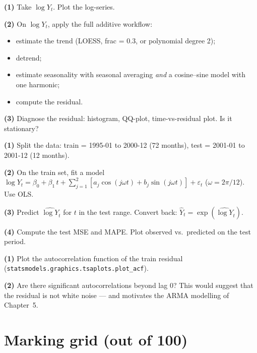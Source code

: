 \documentclass[a4paper,11pt]{article}
\begin{document}
\begin{exercise}
\textbf{(1)} Take $\log Y_t$. Plot the log-series.

\textbf{(2)} On $\log Y_t$, apply the full additive workflow:
\begin{itemize}
  \item estimate the trend (LOESS, frac = 0.3, or polynomial degree 2);
  \item detrend;
  \item estimate seasonality with seasonal averaging \emph{and} a
        cosine--sine model with one harmonic;
  \item compute the residual.
\end{itemize}

\textbf{(3)} Diagnose the residual: histogram, QQ-plot, time-vs-residual
plot. Is it stationary?
\end{exercise}

\begin{exercise}[Forecasting]
\textbf{(1)} Split the data: train = 1995-01 to 2000-12 (72 months),
test = 2001-01 to 2001-12 (12 months).

\textbf{(2)} On the train set, fit a model
$\log Y_t = \beta_0 + \beta_1\,t + \sum_{j=1}^{2}[a_j \cos(j\omega t)
+ b_j \sin(j\omega t)] + \varepsilon_t$ ($\omega = 2\pi/12$).
Use OLS.

\textbf{(3)} Predict $\widehat{\log Y}_t$ for $t$ in the test range.
Convert back: $\widehat{Y}_t = \exp(\widehat{\log Y}_t)$.

\textbf{(4)} Compute the test MSE and MAPE. Plot observed vs.\ predicted
on the test period.
\end{exercise}

\begin{exercise}
\textbf{(1)} Plot the autocorrelation function of the train residual
(\texttt{statsmodels.graphics.tsaplots.plot\_acf}).

\textbf{(2)} Are there significant autocorrelations beyond lag $0$?
This would suggest that the residual is not white noise — and
motivates the ARMA modelling of Chapter~5.
\end{exercise}

\section*{Marking grid (out of 100)}
\end{document}
